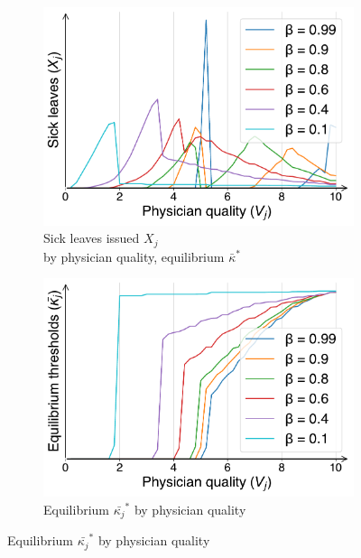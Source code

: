 \documentclass[../main.tex]{subfiles}
\begin{document}
\begin{figure}[p]
    \vspace{0.5cm}

    \begin{subfigure}[b]{0.46\linewidth}
        \centering
        \includegraphics[width=\linewidth]{schnell_X.pdf}
        \vspace{-0.6cm}
        \caption{Sick leaves issued $X_j$ \\ by physician quality, equilibrium $\bar{\kappa}^*$}
        \label{fig:SchnellX}
    \end{subfigure}
    \hspace{0.05\linewidth}  %
    \begin{subfigure}[b]{0.46\linewidth}
        \centering
        \includegraphics[width=\linewidth]{schnell_ks.pdf}
        \vspace{-0.6cm}
        \caption{Equilibrium $\bar{\kappa_j}^*$ by physician quality \\ \text{}}
        \label{fig:Schnellk}
    \end{subfigure}


\end{figure}
\end{document}
